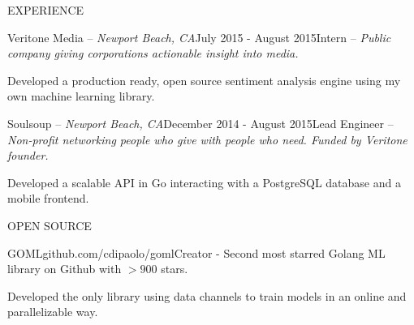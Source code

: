 \documentclass{resume} %
\begin{document}
\begin{rSection}{EXPERIENCE}
\begin{rSubsection}{Veritone Media -- {\it Newport Beach, CA}}{July 2015 - August 2015}{Intern -- {\sl Public company giving corporations actionable insight into media.}}

\item Developed a production ready, open source sentiment analysis engine using my own machine learning library.
\end{rSubsection}

\begin{rSubsection}{Soulsoup -- {\it Newport Beach, CA}}{December 2014 - August 2015}{Lead Engineer -- {\sl Non-profit networking people who give with people who need. Funded by Veritone founder.}}

\item Developed a scalable API in Go interacting with a PostgreSQL database and a
    mobile frontend.
\end{rSubsection} 

\end{rSection}


\begin{rSection}{OPEN SOURCE}

\begin{rSubsection}{GOML}{\textsf{github.com/cdipaolo/goml}}{Creator - Second most starred Golang ML library on Github with $> 900$ stars.}

\item Developed the only library using data channels to train models in an online and parallelizable way.
\end{rSubsection}

\end{rSection}

\end{document}
